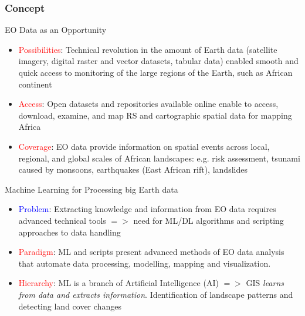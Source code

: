 \documentclass[pdflatex,compress,8pt,
	xcolor={dvipsnames,dvipsnames,svgnames,x11names,table},
	hyperref={colorlinks = true, breaklinks = true, urlcolor = NavyBlue, linkcolor=white, breaklinks = true}]{beamer}
\begin{document}
\begin{frame}\frametitle{Concept}

\begin{exampleblock}{EO Data as an Opportunity}
\begin{itemize}	
	\item \textcolor{red}{Possibilities}: Technical revolution in the amount of Earth data (satellite imagery, digital raster and vector datasets, tabular data) enabled smooth and quick access to monitoring of the large regions of the Earth, such as African continent
	\item \textcolor{red}{Access}: Open datasets and repositories available online enable to access, download, examine, and map RS and cartographic spatial data for mapping Africa
	\item \textcolor{red}{Coverage}: EO data provide information on spatial events across local, regional, and global scales of African landscapes: e.g. risk assessment, tsunami caused by monsoons, earthquakes (East African rift), landslides
\end{itemize}
\end{exampleblock}

\begin{exampleblock}{Machine Learning for Processing big Earth data}
\begin{itemize}
	\item \textcolor{blue}{Problem}: Extracting knowledge and information from EO data requires advanced technical tools $=>$ need for ML/DL algorithms and scripting approaches to data handling
	\item \textcolor{red}{Paradigm}: ML and scripts present advanced methods of EO data analysis that automate data processing, modelling, mapping and visualization.
	\item \textcolor{red}{Hierarchy}: ML is a branch of Artificial Intelligence (AI) $=>$ GIS \emph{learns from data and extracts information}. Identification of landscape patterns and detecting land cover changes 
\end{itemize}
\end{exampleblock}
	
\end{frame}
\end{document}
